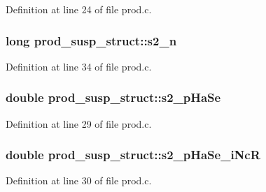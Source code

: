 Definition at line 24 of file prod.\+c.

\subsubsection[{\texorpdfstring{s2\+\_\+n}{s2_n}}]{\setlength{\rightskip}{0pt plus 5cm}long prod\+\_\+susp\+\_\+struct\+::s2\+\_\+n}\hypertarget{structprod__susp__struct_ad9f6031e699420211621706e0d3d7e42}{}\label{structprod__susp__struct_ad9f6031e699420211621706e0d3d7e42}


Definition at line 34 of file prod.\+c.

\subsubsection[{\texorpdfstring{s2\+\_\+p\+Ha\+Se}{s2_pHaSe}}]{\setlength{\rightskip}{0pt plus 5cm}double prod\+\_\+susp\+\_\+struct\+::s2\+\_\+p\+Ha\+Se}\hypertarget{structprod__susp__struct_a37557ab3d835ea03681c607ea8570c46}{}\label{structprod__susp__struct_a37557ab3d835ea03681c607ea8570c46}


Definition at line 29 of file prod.\+c.

\subsubsection[{\texorpdfstring{s2\+\_\+p\+Ha\+Se\+\_\+i\+NcR}{s2_pHaSe_iNcR}}]{\setlength{\rightskip}{0pt plus 5cm}double prod\+\_\+susp\+\_\+struct\+::s2\+\_\+p\+Ha\+Se\+\_\+i\+NcR}\hypertarget{structprod__susp__struct_ab30a3855a3635e0710473565d2cc2484}{}\label{structprod__susp__struct_ab30a3855a3635e0710473565d2cc2484}


Definition at line 30 of file prod.\+c.

